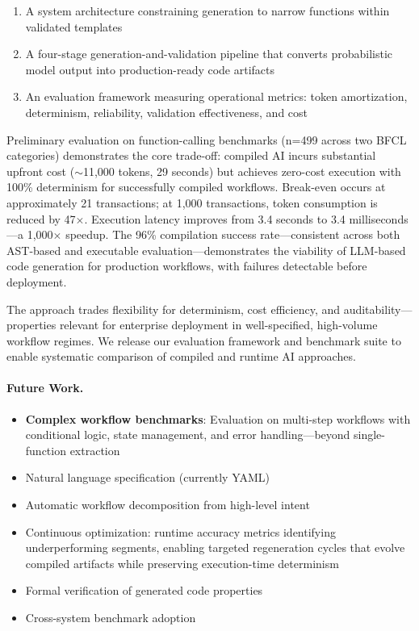 \documentclass[11pt]{article}
\begin{document}
\begin{enumerate}
    \item A system architecture constraining generation to narrow functions within validated templates
    \item A four-stage generation-and-validation pipeline that converts probabilistic model output into production-ready code artifacts
    \item An evaluation framework measuring operational metrics: token amortization, determinism, reliability, validation effectiveness, and cost
\end{enumerate}

Preliminary evaluation on function-calling benchmarks (n=499 across two BFCL categories) demonstrates the core trade-off: compiled AI incurs substantial upfront cost ($\sim$11,000 tokens, 29 seconds) but achieves zero-cost execution with 100\% determinism for successfully compiled workflows. Break-even occurs at approximately 21 transactions; at 1,000 transactions, token consumption is reduced by 47$\times$. Execution latency improves from 3.4 seconds to 3.4 milliseconds---a 1,000$\times$ speedup. The 96\% compilation success rate---consistent across both AST-based and executable evaluation---demonstrates the viability of LLM-based code generation for production workflows, with failures detectable before deployment.

The approach trades flexibility for determinism, cost efficiency, and auditability---properties relevant for enterprise deployment in well-specified, high-volume workflow regimes. We release our evaluation framework and benchmark suite to enable systematic comparison of compiled and runtime AI approaches.

\paragraph{Future Work.}
\begin{itemize}
    \item \textbf{Complex workflow benchmarks}: Evaluation on multi-step workflows with conditional logic, state management, and error handling---beyond single-function extraction
    \item Natural language specification (currently YAML)
    \item Automatic workflow decomposition from high-level intent
    \item Continuous optimization: runtime accuracy metrics identifying underperforming segments, enabling targeted regeneration cycles that evolve compiled artifacts while preserving execution-time determinism
    \item Formal verification of generated code properties
    \item Cross-system benchmark adoption
\end{itemize}
\end{document}
